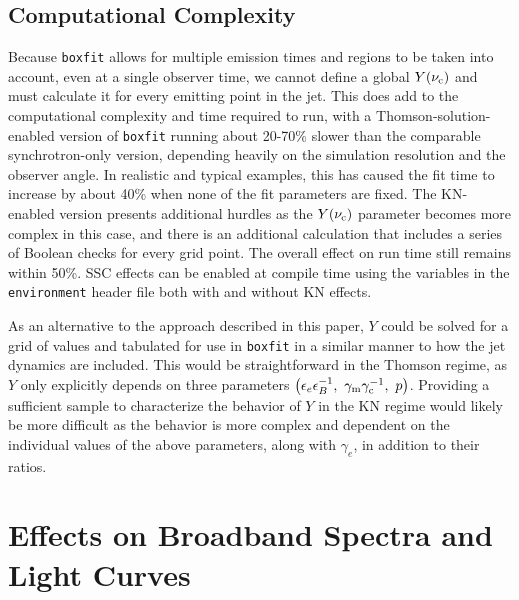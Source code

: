 \documentclass[fleqn,usenatbib]{mnras}
\begin{document}
\subsection{Computational Complexity}

Because \texttt{boxfit} allows for multiple emission times and regions to be taken into account, even at a single observer time, we cannot define a global $Y(\nu_{\rm c})$ and must calculate it for every emitting point in the jet. This does add to the computational complexity and time required to run, with a Thomson-solution-enabled version of \texttt{boxfit} running about 20-70\% slower than the comparable synchrotron-only version, depending heavily on the simulation resolution and the observer angle. In realistic and typical examples, this has caused the fit time to increase by about 40\% when none of the fit parameters are fixed.  The KN-enabled version presents additional hurdles as the $Y(\nu_{\rm c})$ parameter becomes more complex in this case, and there is an additional calculation that includes a series of Boolean checks for every grid point. The overall effect on run time still remains within 50\%. SSC effects can be enabled at compile time using the variables in the \texttt{environment} header file both with and without KN effects.

As an alternative to the approach described in this paper, $Y$ could be solved for a grid of values and tabulated for use in \texttt{boxfit} in a similar manner to how the jet dynamics are included. This would be straightforward in the Thomson regime, as $Y$ only explicitly depends on three parameters $\left(\epsilon_e\epsilon_B^{-1},\ \gamma_{\rm m}\gamma_{\rm c}^{-1},\ p\right)$. Providing a sufficient sample to characterize the behavior of $Y$ in the KN regime would likely be more difficult as the behavior is more complex and dependent on the individual values of the above parameters, along with $\gamma_e$, in addition to their ratios.

\section{Effects on Broadband Spectra and Light Curves}\label{effs}
\end{document}
